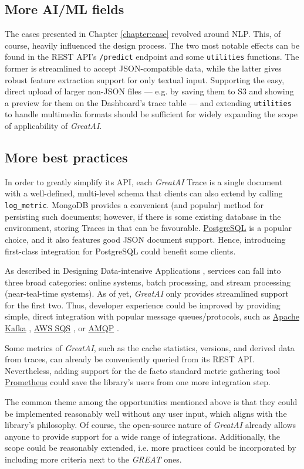 \subsection{More AI/ML fields}

The cases presented in Chapter \ref{chapter:case} revolved around NLP. This, of course, heavily influenced the design process. The two most notable effects can be found in the REST API's \texttt{/predict} endpoint and some \texttt{utilities} functions. The former is streamlined to accept JSON-compatible data, while the latter gives robust feature extraction support for only textual input. Supporting the easy, direct upload of larger non-JSON files --- e.g. by saving them to S3 and showing a preview for them on the Dashboard's trace table --- and extending \texttt{utilities} to handle multimedia formats should be sufficient for widely expanding the scope of applicability of \textit{GreatAI}.

\subsection{More best practices}

In order to greatly simplify its API, each \textit{GreatAI} Trace is a single document with a well-defined, multi-level schema that clients can also extend by calling \texttt{log\_metric}. MongoDB provides a convenient (and popular) method for persisting such documents; however, if there is some existing database in the environment, storing Traces in that can be favourable. \href{https://www.postgresql.org/}{PostgreSQL} is a popular choice, and it also features good JSON document support. Hence, introducing first-class integration for PostgreSQL could benefit some clients.

As described in Designing Data-intensive Applications \cite{kleppmann2017designing}, services can fall into three broad categories: online systems, batch processing, and stream processing (near-teal-time systems). As of yet, \textit{GreatAI} only provides streamlined support for the first two. Thus, developer experience could be improved by providing simple, direct integration with popular message queues/protocols, such as \href{https://kafka.apache.org/}{Apache Kafka} \cite{kreps2011kafka}, \href{https://aws.amazon.com/sqs/}{AWS SQS} \cite{garfinkel2007evaluation}, or \href{https://www.amqp.org/}{AMQP} \cite{vinoski2006advanced}.

Some metrics of \textit{GreatAI}, such as the cache statistics, versions, and derived data from traces, can already be conveniently queried from its REST API. Nevertheless, adding support for the de facto standard metric gathering tool \href{https://prometheus.io/}{Prometheus} could save the library's users from one more integration step.

The common theme among the opportunities mentioned above is that they could be implemented reasonably well without any user input, which aligns with the library's philosophy. Of course, the open-source nature of \textit{GreatAI} already allows anyone to provide support for a wide range of integrations. Additionally, the scope could be reasonably extended, i.e. more practices could be incorporated by including more criteria next to the \textit{GREAT} ones.
